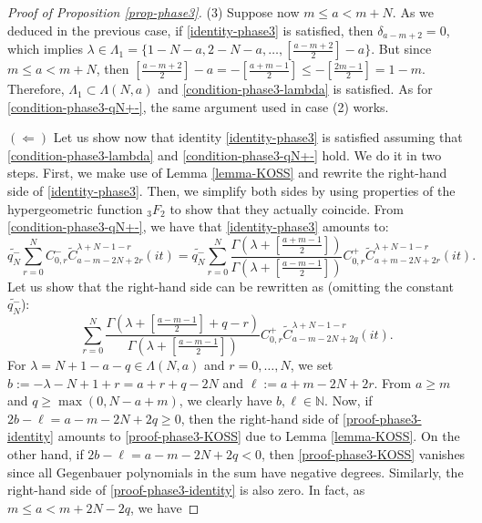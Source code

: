 \documentclass[12pt, pdflatex, a4paper]{article}
\theoremstyle{plain}
\theoremstyle{definition}
\def\Geg{\widetilde{C}}
\def\N{{\mathbb N}}
\begin{document}
\begin{proof}[Proof of Proposition \ref{prop-phase3}]
(3) Suppose now $m \leq a < m+N$. As we deduced in the previous case, if \eqref{identity-phase3} is satisfied, then $\delta_{a-m+2} = 0$, which implies $\lambda \in \Lambda_1 = \{1-N-a, 2-N-a, \ldots, \left[\frac{a-m+2}{2}\right]-a\}$. But since $m \leq a < m+N$, then $\left[\frac{a-m+2}{2}\right]-a = - \left[\frac{a+m-1}{2}\right] \leq - \left[\frac{2m-1}{2}\right] = 1-m$. Therefore, $\Lambda_1 \subset \Lambda(N,a)$ and \eqref{condition-phase3-lambda} is satisfied. As for \eqref{condition-phase3-qN+-}, the same argument used in case (2) works.\medskip

$(\Leftarrow)$ Let us show now that identity \eqref{identity-phase3} is satisfied assuming that \eqref{condition-phase3-lambda} and \eqref{condition-phase3-qN+-} hold. We do it in two steps. First, we make use of Lemma \ref{lemma-KOSS} and rewrite the right-hand side of \eqref{identity-phase3}. Then, we simplify both sides by using properties of the hypergeometric function ${}_3F_2$ to show that they actually coincide. From \eqref{condition-phase3-qN+-}, we have that \eqref{identity-phase3} amounts to:
\begin{equation}\label{proof-phase3-identity}
\widetilde{q_N^-}\sum_{r=0}^{N}C_{0,r}^-\Geg_{a-m-2N+2r}^{\lambda+N-1-r}(it) = \widetilde{q_N^-}\sum_{r=0}^{N}\frac{\Gamma\left(\lambda+\left[\frac{a+m-1}{2}\right]\right)}{\Gamma\left(\lambda+\left[\frac{a-m-1}{2}\right]\right)}C_{0,r}^+\Geg_{a+m-2N+2r}^{\lambda+N-1-r}(it).
\end{equation}
Let us show that the right-hand side can be rewritten as (omitting the constant $\widetilde{q_N^-}$):
\begin{equation}\label{proof-phase3-KOSS}
\sum_{r=0}^{N}\frac{\Gamma\left(\lambda+\left[\frac{a-m-1}{2}\right] + q-r \right)}{\Gamma\left(\lambda+\left[\frac{a-m-1}{2}\right]\right)}C_{0,r}^+\Geg_{a-m-2N+2q}^{\lambda+N-1-r}(it).
\end{equation}
For $\lambda = N+1-a-q \in \Lambda(N,a)$ and $r = 0, \ldots, N$, we set $b := -\lambda-N+1+r = a+r+q-2N$ and $\ell := a+m-2N+2r$. From $a \geq m$ and $q \geq \max(0, N-a+m)$, we clearly have $b, \ell \in \N$. Now, if $2b-\ell = a-m-2N+2q \geq 0$, then the right-hand side of \eqref{proof-phase3-identity} amounts to \eqref{proof-phase3-KOSS} due to Lemma \ref{lemma-KOSS}. On the other hand, if $2b-\ell = a-m-2N+2q <0$, then \eqref{proof-phase3-KOSS} vanishes since all Gegenbauer polynomials in the sum have negative degrees. Similarly, the right-hand side of \eqref{proof-phase3-identity} is also zero. In fact, as $m \leq a < m+2N-2q$, we have

\end{proof}
\end{document}
